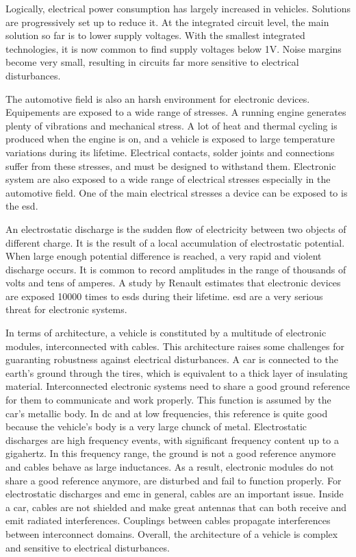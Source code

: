 Logically, electrical power consumption has largely increased in vehicles.
Solutions are progressively set up to reduce it.
At the integrated circuit level, the main solution so far is to lower supply voltages.
With the smallest integrated technologies, it is now common to find supply voltages below 1V.
Noise margins become very small, resulting in circuits far more sensitive to electrical disturbances.

The automotive field is also an harsh environment for electronic devices.
Equipements are exposed to a wide range of stresses.
A running engine generates plenty of vibrations and mechanical stress.
A lot of heat and thermal cycling is produced when the engine is on, and a vehicle is exposed to large temperature variations during its lifetime.
Electrical contacts, solder joints and connections suffer from these stresses, and must be designed to withstand them.
Electronic system are also exposed to a wide range of electrical stresses especially in the automotive field.
One of the main electrical stresses a device can be exposed to is the \gls{esd}.

An electrostatic discharge is the sudden flow of electricity between two objects of different charge.
It is the result of a local accumulation of electrostatic potential.
When large enough potential difference is reached, a very rapid and violent discharge occurs.
It is common to record amplitudes in the range of thousands of volts and tens of amperes.
A study by Renault \cite{Renault-esd} estimates that electronic devices are exposed 10000 times to \gls{esd}s during their lifetime.
\gls{esd} are a very serious threat for electronic systems.

In terms of architecture, a vehicle is constituted by a multitude of electronic modules, interconnected with cables.
This architecture raises some challenges for guaranting robustness against electrical disturbances.
A car is connected to the earth's ground through the tires, which is equivalent to a thick layer of insulating material.
Interconnected electronic systems need to share a good ground reference for them to communicate and work properly.
This function is assumed by the car's metallic body.
In \gls{dc} and at low frequencies, this reference is quite good because the vehicle's body is a very large chunck of metal.
Electrostatic discharges are high frequency events, with significant frequency content up to a gigahertz.
In this frequency range, the ground is not a good reference anymore and cables behave as large inductances.
As a result, electronic modules do not share a good reference anymore, are disturbed and fail to function properly.
For electrostatic discharges and \gls{emc} in general, cables are an important issue.
Inside a car, cables are not shielded and make great antennas that can both receive and emit radiated interferences.
Couplings between cables propagate interferences between interconnect domains.
Overall, the architecture of a vehicle is complex and sensitive to electrical disturbances.

